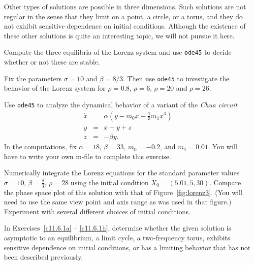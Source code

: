 \documentclass{ximera}
\begin{document}
Other types of solutions are possible in three dimensions.  Such solutions
are not regular in the sense that they limit on a point, a circle, or a
torus, and they do not exhibit sensitive dependence on initial conditions.  
Although the existence of these other solutions is quite an interesting
topic, we will not pursue it here. 


\EXER

\CEXER



\begin{exercise} \label{c11.4.1}
Compute the three equilibria of the Lorenz system 
and use {\tt ode45} to decide whether or not these are stable.
\end{exercise}

\begin{exercise} \label{c11.4.2}
Fix the parameters $\sigma=10$ and $\beta = 8/3$.  Then
use {\tt ode45} to investigate the behavior of the Lorenz system
 for $\rho=0.8$, $\rho=6$, $\rho=20$ and $\rho=26$.
\end{exercise}

\begin{exercise} \label{c11.4.3}
Use {\tt ode45} to analyze the dynamical behavior of a variant of the 
{\em Chua circuit}
\begin{eqnarray*}
  \dot{x} &=& \alpha\left(y-m_0x-\frac{1}{3}m_1x^3\right) \\
  \dot{y} &=& x-y+z \\
  \dot{z} &=& - \beta y.
\end{eqnarray*}
In the computations, fix $\alpha=18$, $\beta=33$, $m_0=-0.2$, and $m_1=0.01$.
You will have to write your own m-file to complete this exercise. 
\end{exercise}

\begin{exercise} \label{c11.4.3a}
Numerically integrate the Lorenz equations  for the standard 
parameter values $\sigma=10$, $\beta=\frac{8}{3}$, $\rho=28$ using the initial 
condition $X_0 =(5.01,5,30)$.  Compare the phase space plot of this solution 
with that of Figure~\ref{fig:lorenz3}.  (You will need to use the same view
point and axis range as was used in that figure.)  Experiment with several 
different choices of initial conditions.
\end{exercise}


\noindent In Exercises~\ref{c11.6.1a} -- \ref{c11.6.1h}, determine whether the 
given solution is asymptotic to an equilibrium, a limit cycle, a two-frequency 
torus, exhibits sensitive dependence on initial conditions, or has a limiting 
behavior that has not been described previously.
\end{document}
